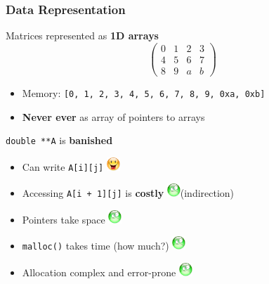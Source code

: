 \documentclass[xcolor={rgb,x11names,svgnames},rgb,x11names,svgnames]{beamer}
\newcommand{\triste}{\includegraphics[width=0.5cm,trim=0 17mm 0 0]{triste}}
\newcommand{\smiley}{\includegraphics[width=0.5cm,trim=0 17mm 0 0]{content}}
\begin{document}
\begin{frame}[label=blasdata,fragile=singleslide]
  \frametitle{Data Representation}

  \begin{exampleblock}{Matrices represented as \textbf{\alert{1D arrays}}}
    \vspace*{-2ex}
    \[
      \begin{pmatrix}
        0 & 1 & 2 & 3 \\
        4 & 5 & 6 & 7 \\
        8 & 9 & a & b
      \end{pmatrix}
    \]
    \vspace*{-2ex}
    \begin{itemize}
    \item Memory: \texttt{[0, 1, 2, 3, 4, 5, 6, 7, 8, 9, 0xa, 0xb]}
    \item \textbf{Never ever} as array of pointers to arrays
    \end{itemize}
  \end{exampleblock}
  
  \begin{alertblock}{\texttt{double **A} is \textbf{banished}}
    \begin{itemize}
    \item Can write \texttt{A[i][j]} \smiley
    \item Accessing \texttt{A[i + 1][j]} is \textbf{costly} \triste (indirection)
    \item Pointers take space \triste
    \item \texttt{malloc()} takes time (how much?) \triste
    \item Allocation complex and error-prone \triste
    \end{itemize}
  \end{alertblock}
\end{frame}

\end{document}
